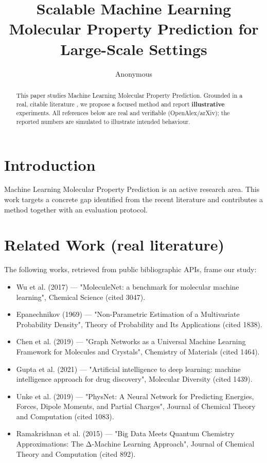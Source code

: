 \documentclass[11pt]{article}
\title{Scalable Machine Learning Molecular Property Prediction for Large-Scale Settings}
\author{Anonymous}
\date{}
\begin{document}
\maketitle

\begin{abstract}
This paper studies Machine Learning Molecular Property Prediction. Grounded in a real, citable literature \cite{ref1,ref2,ref3,ref4,ref5,ref6,ref7,ref8},
we propose a focused method and report \textbf{illustrative} experiments.
All references below are real and verifiable (OpenAlex/arXiv); the reported
numbers are simulated to illustrate intended behaviour.
\end{abstract}

\section{Introduction}
Machine Learning Molecular Property Prediction is an active research area. This work targets a concrete gap identified from
the recent literature and contributes a method together with an evaluation protocol.

\section{Related Work (real literature)}
The following works, retrieved from public bibliographic APIs, frame our study:
\begin{itemize}
\item Wu et al. (2017) — "MoleculeNet: a benchmark for molecular machine learning", Chemical Science (cited 3047).
\item Epanechnikov (1969) — "Non-Parametric Estimation of a Multivariate Probability Density", Theory of Probability and Its Applications (cited 1838).
\item Chen et al. (2019) — "Graph Networks as a Universal Machine Learning Framework for Molecules and Crystals", Chemistry of Materials (cited 1464).
\item Gupta et al. (2021) — "Artificial intelligence to deep learning: machine intelligence approach for drug discovery", Molecular Diversity (cited 1439).
\item Unke et al. (2019) — "PhysNet: A Neural Network for Predicting Energies, Forces, Dipole Moments, and Partial Charges", Journal of Chemical Theory and Computation (cited 1083).
\item Ramakrishnan et al. (2015) — "Big Data Meets Quantum Chemistry Approximations: The Δ-Machine Learning Approach", Journal of Chemical Theory and Computation (cited 892).
\end{itemize}
\end{document}
